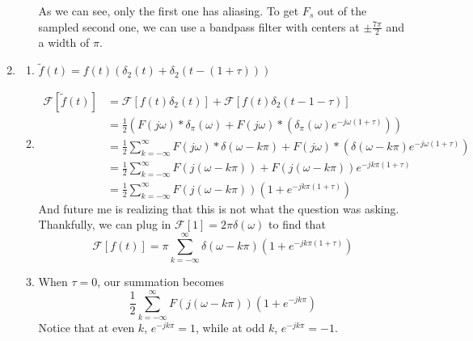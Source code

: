 \documentclass[12pt]{article}
\newcommand{\ft}[1]{\mathcal{F}\left[#1\right]}
\begin{document}
\begin{enumerate}
\begin{enumerate}
                        As we can see, only the first one has aliasing.
                        To get $F_s$ out of the sampled second one, we can use a bandpass
                        filter with centers at $\pm \frac{7\pi}{2}$ and a width of $\pi$.
            \end{enumerate}
      \item \begin{enumerate}
                  \item $\tilde{f}(t)=f(t)(\delta_2(t)+\delta_2(t-(1+\tau)))$
                  \item \[\begin{aligned}
                                    \ft{\tilde{f}(t)}
                                     & = \ft{f(t)\delta_2(t)}+\ft{f(t)\delta_2(t-1-\tau)}                                                                                           \\
                                     & = \frac{1}{2} \left(F(j\omega) * \delta_{\pi}(\omega)+F(j\omega) * \left(\delta_{\pi}(\omega)e^{-j\omega(1+\tau)}\right)\right)              \\
                                     & = \frac{1}{2} \sum_{k=-\infty}^{\infty} F(j\omega) * \delta(\omega-k\pi) + F(j\omega) * \left(\delta(\omega-k\pi)e^{-j\omega(1+\tau)}\right) \\
                                     & = \frac{1}{2} \sum_{k=-\infty}^{\infty} F(j(\omega-k\pi))+F(j(\omega-k\pi))e^{-jk\pi(1+\tau)}                                                \\
                                     & = \frac{1}{2} \sum_{k=-\infty}^{\infty} F(j(\omega-k\pi))\left(1+e^{-jk\pi(1+\tau)}\right)
                              \end{aligned}\] \label{list:2b}
                              And future me is realizing that this is not what the question was asking.
                              Thankfully, we can plug in $\ft{1}=2\pi\delta(\omega)$ to find that
                              \[\boxed{\ft{f(t)}=\pi \sum_{k=-\infty}^{\infty} \delta(\omega-k\pi)\left(1+e^{-jk\pi(1+\tau)}\right)}\]
                              
                  \item When $\tau=0$, our summation becomes
                        \[\frac{1}{2} \sum_{k=-\infty}^{\infty} F(j(\omega-k\pi))\left(1+e^{-jk\pi}\right)\]
                        Notice that at even $k$, $e^{-jk\pi}=1$, while at odd $k$, $e^{-jk\pi}=-1$.


\end{enumerate}
\end{enumerate}
\end{document}

